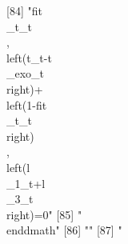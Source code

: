  [84] "{{fit\\_t}_{t}}\\, \\left({t_{t}}-{{t\\_exo}_{t}}\\right)+\\left(1-{{fit\\_t}_{t}}\\right)\\, \\left({{l\\_1}_{t}}+{{l\\_3}_{t}}\\right)=0"                                                                                                                                                                                                                                                                                                                                                                                                                                                                                                   
 [85] "\\end{dmath}"                                                                                                                                                                                                                                                                                                                                                                                                                                                                                                                                                                                                                                 
 [86] ""                                                                                                                                                                                                                                                                                                                                                                                                                                                                                                                                                                                                                                             
 [87] "%
